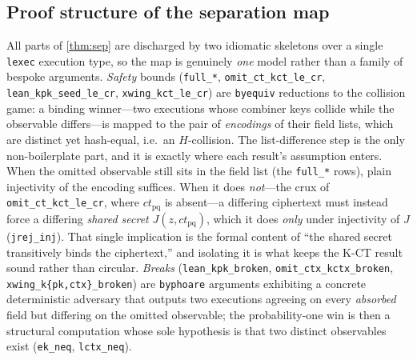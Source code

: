 \documentclass[journal]{IEEEtran}
\newcommand{\code}[1]{\texttt{\small #1}}
\begin{document}
\subsection{Proof structure of the separation map}\label{app:sepproof}
All parts of \cref{thm:sep} are discharged by two idiomatic skeletons over a single \code{lexec}
execution type, so the map is genuinely \emph{one} model rather than a family of bespoke arguments.
\emph{Safety} bounds (\code{full\_*}, \code{omit\_ct\_kct\_le\_cr}, \code{lean\_kpk\_seed\_le\_cr},
\code{xwing\_kct\_le\_cr}) are \code{byequiv} reductions to the collision game: a binding
winner---two executions whose combiner keys collide while the observable differs---is mapped to the
pair of \emph{encodings} of their field lists, which are distinct yet hash-equal, i.e.\ an
$H$-collision. The list-difference step is the only non-boilerplate part, and it is exactly where
each result's assumption enters. When the omitted observable still sits in the field list (the
\code{full\_*} rows), plain injectivity of the encoding suffices. When it does \emph{not}---the
crux of \code{omit\_ct\_kct\_le\_cr}, where $ct_{\mathrm{pq}}$ is absent---a differing ciphertext must
instead force a differing \emph{shared secret} $J(z,ct_{\mathrm{pq}})$, which it does \emph{only}
under injectivity of $J$ (\code{jrej\_inj}). That single implication is the formal content of ``the
shared secret transitively binds the ciphertext,'' and isolating it is what keeps the K-CT result
sound rather than circular. \emph{Breaks} (\code{lean\_kpk\_broken}, \code{omit\_ctx\_kctx\_broken},
\code{xwing\_k\{pk,ctx\}\_broken}) are \code{byphoare} arguments exhibiting a concrete deterministic
adversary that outputs two executions agreeing on every \emph{absorbed} field but differing on the
omitted observable; the probability-one win is then a structural computation whose sole hypothesis is
that two distinct observables exist (\code{ek\_neq}, \code{lctx\_neq}).
\end{document}
